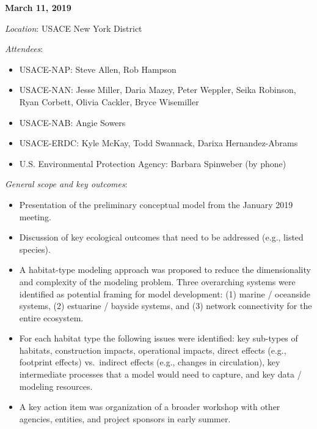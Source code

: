 \documentclass[
]{book}
\providecommand{\tightlist}{%
  \setlength{\itemsep}{0pt}\setlength{\parskip}{0pt}}
\begin{document}
\textbf{March 11, 2019}

\emph{Location}: USACE New York District

\emph{Attendees}:

\begin{itemize}
\tightlist
\item
  USACE-NAP: Steve Allen, Rob Hampson\\
\item
  USACE-NAN: Jesse Miller, Daria Mazey, Peter Weppler, Seika Robinson, Ryan Corbett, Olivia Cackler, Bryce Wisemiller\\
\item
  USACE-NAB: Angie Sowers\\
\item
  USACE-ERDC: Kyle McKay, Todd Swannack, Darixa Hernandez-Abrams\\
\item
  U.S. Environmental Protection Agency: Barbara Spinweber (by phone)
\end{itemize}

\emph{General scope and key outcomes}:

\begin{itemize}
\tightlist
\item
  Presentation of the preliminary conceptual model from the January 2019 meeting.\\
\item
  Discussion of key ecological outcomes that need to be addressed (e.g., listed species).\\
\item
  A habitat-type modeling approach was proposed to reduce the dimensionality and complexity of the modeling problem. Three overarching systems were identified as potential framing for model development: (1) marine / oceanside systems, (2) estuarine / bayside systems, and (3) network connectivity for the entire ecosystem.\\
\item
  For each habitat type the following issues were identified: key sub-types of habitats, construction impacts, operational impacts, direct effects (e.g., footprint effects) vs.~indirect effects (e.g., changes in circulation), key intermediate processes that a model would need to capture, and key data / modeling resources.\\
\item
  A key action item was organization of a broader workshop with other agencies, entities, and project sponsors in early summer.
\end{itemize}
\end{document}
